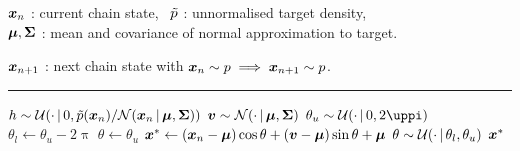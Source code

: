 \begin{algorithmic}
\small
    \Require
    $\boldsymbol{x}_n$ : current chain state,~
    $\tilde{p}$ : unnormalised target density,\\
    $\boldsymbol{\mu},\boldsymbol{\Sigma}$ : mean and covariance of normal approximation to target.
    \Ensure\raggedright
    $\boldsymbol{x}_{n+1}$ : next chain state with $\boldsymbol{x}_n \sim p \implies \boldsymbol{x}_{n+1} \sim p$.
\end{algorithmic}
\hrule
\small
\begin{algorithmic}[1]
  \State $h \sim \mathcal{U}\lpa \cdot \gvn 0,\utgtdens(\vct{x}_n) / \nrm{\vct{x}_n \gvn \vct{\mu}, \mtx{\Sigma}}\rpa$ 
  \State $\vct{v} \sim \nrm{\cdot \gvn \vct{\mu}, \mtx{\Sigma}}$ 
  \State $\theta_u \sim \mathcal{U}(\cdot \gvn 0,2\uppi)$ 
  \State $\theta_l \gets \theta_u - 2\uppi$
  \State $\theta \gets \theta_u$
    \State $\boldsymbol{x}^* \gets (\boldsymbol{x}_n - \boldsymbol{\mu}) \cos\theta + (\boldsymbol{v} - \boldsymbol{\mu}) \sin\theta + \boldsymbol{\mu}$  
     
       
      \State $\theta \sim \mathcal{U}(\cdot \operatorname{|} \theta_l, \theta_u)$ 
    \Else
      \State \Return $\boldsymbol{x}^*$
    \EndIf
  \EndWhile
\end{algorithmic}

